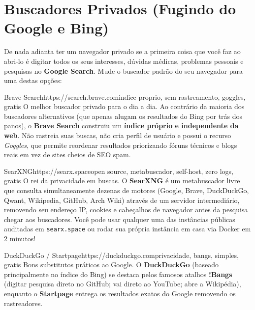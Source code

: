 \documentclass{pousadaguide}
\begin{document}
\section{Buscadores Privados (Fugindo do Google e Bing)}

De nada adianta ter um navegador privado se a primeira coisa que você faz ao abri-lo é digitar todos os seus interesses, dúvidas médicas, problemas pessoais e pesquisas no \textbf{Google Search}. Mude o buscador padrão do seu navegador para uma destas opções:

\begin{ferramenta}[goat,logo=brave]{Brave Search}{https://search.brave.com}{indice proprio, sem rastreamento, goggles, gratis}
O melhor buscador privado para o dia a dia. Ao contrário da maioria dos buscadores alternativos (que apenas alugam os resultados do Bing por trás dos panos), o \textbf{Brave Search} construiu um \textbf{índice próprio e independente da web}. Não rastreia suas buscas, não cria perfil de usuário e possui o recurso \emph{Goggles}, que permite reordenar resultados priorizando fóruns técnicos e blogs reais em vez de sites cheios de SEO spam. 
\end{ferramenta}

\begin{ferramenta}[goat,logo=searxng]{SearXNG}{https://searx.space}{open source, metabuscador, self-host, zero logs, gratis}
O rei da privacidade em buscas. O \textbf{SearXNG} é um metabuscador livre que consulta simultaneamente dezenas de motores (Google, Brave, DuckDuckGo, Qwant, Wikipedia, GitHub, Arch Wiki) através de um servidor intermediário, removendo seu endereço IP, cookies e cabeçalhos de navegador antes da pesquisa chegar aos buscadores. Você pode usar qualquer uma das instâncias públicas auditadas em \texttt{searx.space} ou rodar sua própria instância em casa via Docker em 2 minutos! 
\end{ferramenta}

\begin{ferramenta}[recomendado,logo=duckduckgo]{DuckDuckGo / Startpage}{https://duckduckgo.com}{privacidade, bangs, simples, gratis}
Bons substitutos práticos ao Google. O \textbf{DuckDuckGo} (baseado principalmente no índice do Bing) se destaca pelos famosos atalhos \textbf{!Bangs} (digitar  pesquisa direto no GitHub;  vai direto ao YouTube;  abre a Wikipédia), enquanto o \textbf{Startpage} entrega os resultados exatos do Google removendo os rastreadores. 
\end{ferramenta}
\end{document}
